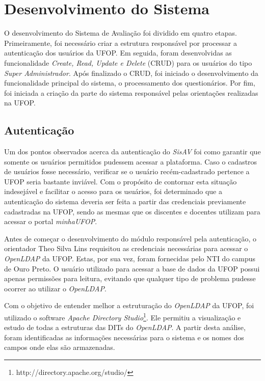 \documentclass[
  12pt,       %
  openright,      %
  oneside,      %
  a4paper,      %
  english,      %
  french,        %
  spanish,     %
  brazil        %
  ]{abntex2-decsi}
\begin{document}
    \section{Desenvolvimento do Sistema}
    
    O desenvolvimento do Sistema de Avaliação foi dividido em quatro etapas. Primeiramente, foi necessário criar a estrutura responsável por processar a autenticação dos usuários da UFOP. Em seguida, foram desenvolvidas as funcionalidade \textit{Create, Read, Update e Delete} (CRUD) para os usuários do tipo \textit{Super Administrador}. Após finalizado o CRUD, foi iniciado o desenvolvimento da funcionalidade principal do sistema, o processamento dos questionários. Por fim, foi iniciada a criação da parte do sistema responsável pelas orientações realizadas na UFOP.
    
        \subsection{Autenticação}

    Um dos pontos observados acerca da autenticação do \textit{SisAV} foi como garantir que somente os usuários permitidos pudessem acessar a plataforma. Caso o cadastros de usuários fosse necessário, verificar se o usuário recém-cadastrado pertence a UFOP seria bastante inviável. Com o propósito de contornar esta situação indesejável e facilitar o acesso para os usuários, foi determinado que a autenticação do sistema deveria ser feita a partir das credenciais previamente cadastradas na UFOP, sendo as mesmas que os discentes e docentes utilizam para acessar o portal \textit{minhaUFOP}.

    Antes de começar o desenvolvimento do módulo responsável pela autenticação, o orientador Theo Silva Lins requisitou as credenciais necessárias para acessar o \textit{OpenLDAP} da UFOP. Estas, por sua vez, foram fornecidas pelo NTI do campus de Ouro Preto. O usuário utilizado para acessar a base de dados da UFOP possui apenas permissões para leitura, evitando que qualquer tipo de problema pudesse ocorrer ao utilizar o \textit{OpenLDAP}.

    Com o objetivo de entender melhor a estruturação do \textit{OpenLDAP} da UFOP, foi utilizado o software \textit{Apache Directory Studio}\footnote{http://directory.apache.org/studio/}. Ele permitiu a visualização e estudo de todas a estruturas das DITs do \textit{OpenLDAP}. A partir desta análise, foram identificadas as informações necessárias para o sistema e os nomes dos campos onde elas são armazenadas.
    
\end{document}
